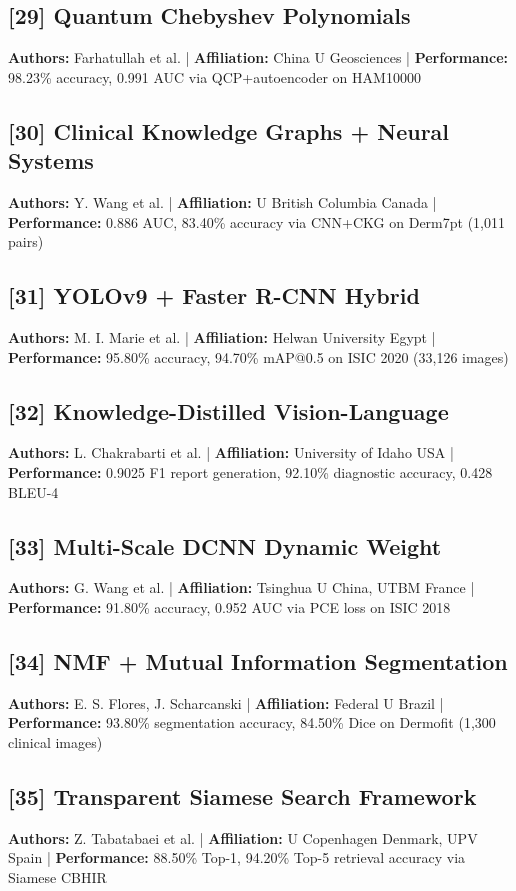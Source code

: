 \documentclass[10pt,twocolumn]{article}
\begin{document}
\subsection*{[29] Quantum Chebyshev Polynomials}
\textbf{Authors:} Farhatullah et al. | \textbf{Affiliation:} China U Geosciences | \textbf{Performance:} 98.23\% accuracy, 0.991 AUC via QCP+autoencoder on HAM10000

\subsection*{[30] Clinical Knowledge Graphs + Neural Systems}
\textbf{Authors:} Y. Wang et al. | \textbf{Affiliation:} U British Columbia Canada | \textbf{Performance:} 0.886 AUC, 83.40\% accuracy via CNN+CKG on Derm7pt (1,011 pairs)

\subsection*{[31] YOLOv9 + Faster R-CNN Hybrid}
\textbf{Authors:} M. I. Marie et al. | \textbf{Affiliation:} Helwan University Egypt | \textbf{Performance:} 95.80\% accuracy, 94.70\% mAP@0.5 on ISIC 2020 (33,126 images)

\subsection*{[32] Knowledge-Distilled Vision-Language}
\textbf{Authors:} L. Chakrabarti et al. | \textbf{Affiliation:} University of Idaho USA | \textbf{Performance:} 0.9025 F1 report generation, 92.10\% diagnostic accuracy, 0.428 BLEU-4

\subsection*{[33] Multi-Scale DCNN Dynamic Weight}
\textbf{Authors:} G. Wang et al. | \textbf{Affiliation:} Tsinghua U China, UTBM France | \textbf{Performance:} 91.80\% accuracy, 0.952 AUC via PCE loss on ISIC 2018

\subsection*{[34] NMF + Mutual Information Segmentation}
\textbf{Authors:} E. S. Flores, J. Scharcanski | \textbf{Affiliation:} Federal U Brazil | \textbf{Performance:} 93.80\% segmentation accuracy, 84.50\% Dice on Dermofit (1,300 clinical images)

\subsection*{[35] Transparent Siamese Search Framework}
\textbf{Authors:} Z. Tabatabaei et al. | \textbf{Affiliation:} U Copenhagen Denmark, UPV Spain | \textbf{Performance:} 88.50\% Top-1, 94.20\% Top-5 retrieval accuracy via Siamese CBHIR
\end{document}
